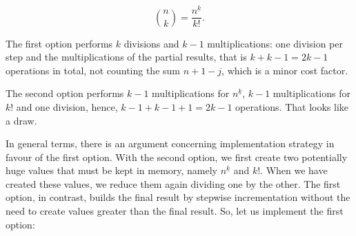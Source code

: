 \documentclass{scrreprt}
\begin{document}
\begin{equation}
\binom{n}{k} = \frac{n^{\underline{k}}}{k!}.
\end{equation}

The first option
performs $k$ divisions and $k-1$ multiplications:
one division per step and the multiplications
of the partial results,
that is $k + k - 1 = 2k-1$ operations in total,
not counting the sum $n + 1 -j$,
which is a minor cost factor.

The second option
performs $k-1$ multiplications for $n^{\underline{k}}$,
$k-1$ multiplications for $k!$ and one division,
hence, $k - 1 + k - 1 + 1 = 2k-1$ operations.
That looks like a draw.

In general terms,
there is an argument concerning implementation strategy
in favour of the first option.
With the second option, we first create
two potentially huge values that must be kept in memory,
namely $n^{\underline{k}}$ and $k!$.
When we have created these values,
we reduce them again dividing one by the other.
The first option, in contrast,
builds the final result by stepwise incrementation
without the need 
to create values greater than the final result.
So, let us implement the first option:
\end{document}
